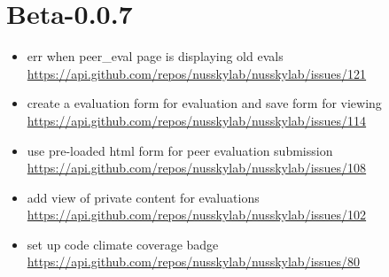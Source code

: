 {\section{Beta-0.0.7}
\begin{itemize}[noitemsep]
    \item err when peer\_eval page is displaying old evals \url{https://api.github.com/repos/nusskylab/nusskylab/issues/121} 
    \item create a evaluation form for evaluation and save form for viewing \url{https://api.github.com/repos/nusskylab/nusskylab/issues/114} 
    \item use pre-loaded html form for peer evaluation submission \url{https://api.github.com/repos/nusskylab/nusskylab/issues/108} 
    \item add view of private content for evaluations \url{https://api.github.com/repos/nusskylab/nusskylab/issues/102} 
    \item set up code climate coverage badge \url{https://api.github.com/repos/nusskylab/nusskylab/issues/80} 
\end{itemize}

}
